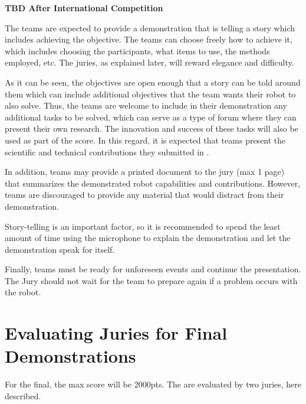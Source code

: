 \textbf{TBD After International Competition}




The teams are expected to provide a demonstration that is telling a story which includes achieving the objective. The teams can choose freely how to achieve it, which includes choosing the participants, what items to use, the methods employed, etc. The juries, as explained later, will reward elegance and difficulty.

As it can be seen, the objectives are open enough that a story can be told around them which can include additional objectives that the team wants their robot to also solve. Thus, the teams are welcome to include in their demonstration any additional tasks to be solved, which can serve as a type of forum where they can present their own research. The innovation and success of these tasks will also be used as part of the score. In this regard, it is expected that teams present the scientific and technical contributions they submitted in .

In addition, teams may provide a printed document to the jury (max 1 page) that summarizes the demonstrated robot capabilities and contributions. However, teams are discouraged to provide any material that would distract from their demonstration.

Story-telling is an important factor, so it is recommended to spend the least amount of time using the microphone to explain the demonstration and let the demonstration speak for itself.

Finally, teams must be ready for unforeseen events and continue the presentation. The Jury should not wait for the team to prepare again if a problem occurs with the robot.


\section{Evaluating Juries for Final Demonstrations}
For the final, the max score will be 2000pts.
The  are evaluated by two juries, here described.


